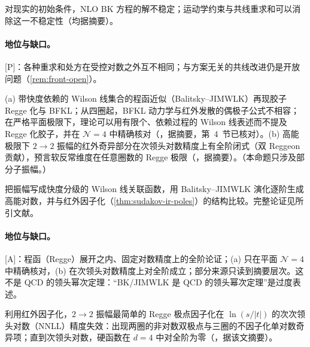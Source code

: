 \begin{proposition}\label{prop:front-bk-collinear}
对现实的初始条件，NLO BK 方程的解不稳定\cite{Lappi:2015fma}；运动学约束与共线重求和可以消除这一不稳定性\cite{Beuf:2014uia,Iancu:2015vea}（均据摘要）。
\end{proposition}

\paragraph{地位与缺口。}[P]：各种重求和处方在受控对数之外互不相同；与方案无关的共线改进仍是开放问题（\cref{rem:front-open}）。

\begin{proposition}\label{prop:front-regge}\hfill\break
(a) 带快度依赖的 Wilson 线集合的程函近似（Balitsky--JIMWLK）再现胶子 Regge 化与 BFKL；从四圈起，BFKL 动力学与红外发散的偶极子公式不相容；在严格平面极限下，理论可以用有限个、依赖过程的 Wilson 线表述而不提及 Regge 化胶子，并在 $\mathcal N=4$ 中精确核对（\cite{Caron-Huot:2013fea}，据摘要，第~4~节已核对）。(b) 高能极限下 $2\to2$ 振幅的红外奇异部分在次领头对数精度上有全阶闭式（双 Reggeon 贡献），预言软反常维度在任意圈数的 Regge 极限（\cite{Caron-Huot:2017zfo}，据摘要）。（本命题只涉及部分子振幅。）
\end{proposition}

\begin{proofsketch}
把振幅写成快度分级的 Wilson 线关联函数，用 Balitsky--JIMWLK 演化逐阶生成高能对数，并与红外因子化（\cref{thm:sudakov-ir-poles}）的结构比较。完整论证见所引文献。
\end{proofsketch}

\paragraph{地位与缺口。}[A]：程函（Regge）展开之内、固定对数精度上的全阶论证；(a) 只在平面 $\mathcal N=4$ 中精确核对，(b) 在次领头对数精度上对全阶成立；部分来源只读到摘要层次。这不是 QCD 的领头幂次定理：“BK/JIMWLK 是 QCD 的领头幂次定理”是过度表述。

\begin{proposition}\label{prop:front-regge-pole}
利用红外因子化，$2\to2$ 振幅最简单的 Regge 极点因子化在 $\ln(s/|t|)$ 的次次领头对数（NNLL）精度失效：出现两圈的非对数双极点与三圈的不因子化单对数奇异项；直到次领头对数，硬函数在 $d=4$ 中对全阶为零（\cite{DelDuca:2013ara,DelDuca:2014cya}，据该文摘要）。
\end{proposition}

